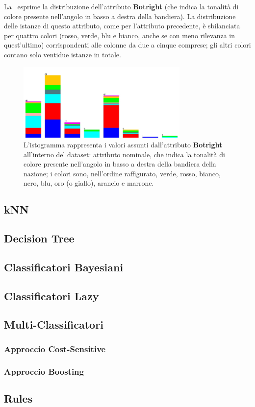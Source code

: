 \documentclass[a4paper,11pt,twoside,notitlepage,final]{scrartcl}
\begin{document}
La~ esprime la distribuzione dell'attributo \textbf{Botright} (che indica la tonalità di colore presente nell'angolo in basso a destra della bandiera).
La distribuzione delle istanze di questo attributo, come per l'attributo precedente, è sbilanciata per quattro colori (rosso, verde, blu e bianco, anche se con meno rilevanza in quest'ultimo) corrispondenti alle colonne da due a cinque comprese; gli altri colori contano solo ventidue istanze in totale.

\begin{figure}[H]
  \centering
  \includegraphics[width=0.75\textwidth]{fig/religion-botright.jpg}%
  \caption{%
    L'istogramma rappresenta i valori assunti dall'attributo \textbf{Botright}
    all'interno del dataset: attributo nominale, che indica la tonalità di colore presente nell'angolo in basso a destra della bandiera della nazione;
    i colori sono, nell'ordine raffigurato, verde, rosso, bianco, nero, blu, oro (o giallo), arancio e marrone.
    }%
  \label{fig:botright}
\end{figure}

\subsection{kNN}
\subsection{Decision Tree}
\subsection{Classificatori Bayesiani}
\subsection{Classificatori Lazy}
\subsection{Multi-Classificatori}
\subsubsection{Approccio Cost-Sensitive}
\subsubsection{Approccio Boosting}
\subsection{Rules}
\end{document}
